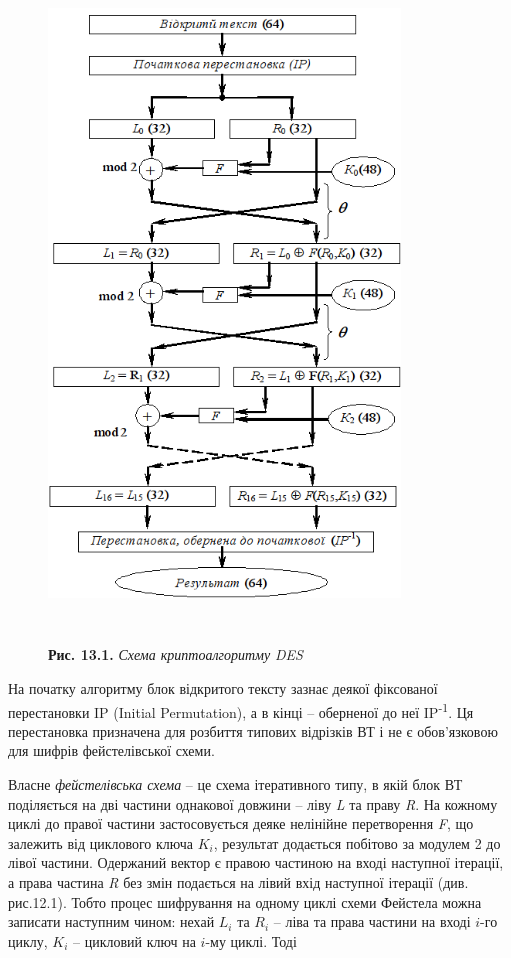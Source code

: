\documentclass[a4paper]{article}
\newcounter{}
\begin{document}
\begin{figure}
\centering
\begin{minipage}{}
 \includegraphics[width=3.6764in,height=6.7484in]{crypt-img/crypt-img295.png} 
\begin{minipage}{3.25in}
\textbf{Рис. 13.1.} \textit{Схема криптоалгоритму }\textit{DES}
\end{minipage}\end{minipage}
\end{figure}
На початку алгоритму блок відкритого тексту зазнає деякої фіксованої
перестановки  IP (Initial Permutation), а в кінці – оберненої до неї
IP\textsuperscript{{}-1}. Ця перестановка призначена для розбиття типових
відрізків ВТ і не є обов’язковою для шифрів фейстелівської схеми.

 Власне \textit{фейстелівська схема} – це схема ітеративного типу, в якій блок
ВТ поділяється на дві частини однакової довжини – ліву \textit{L} та праву
\textit{R}. На кожному циклі до правої частини застосовується деяке нелінійне
перетворення \textit{F}, що залежить від циклового ключа  ${K_{{i}}}$,
результат додається побітово за модулем 2 до лівої частини. Одержаний вектор є
правою частиною на вході наступної ітерації, а права частина \textit{R}  без
змін подається на лівий вхід наступної ітерації (див. рис.12.1). Тобто процес
шифрування на одному циклі схеми Фейстела можна записати наступним чином: нехай
 ${L_{{i}}}$ та   ${R_{{i}}}$ – ліва та права частини на вході  ${i}${}-го
циклу,  ${K_{{i}}}$ – цикловий ключ на   ${i}${}-му циклі. Тоді
\end{document}
